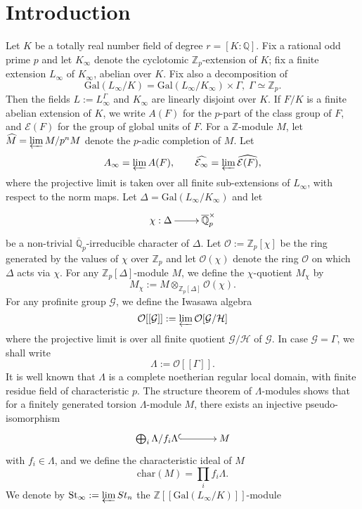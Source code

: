 \documentclass[reqno]{amsart}
\begin{document}
\section{Introduction}
 Let $K$ be a totally real number field of degree $r=[K:\mathbb{Q}]$. Fix a rational odd
prime $p$ and let $K_{\infty}$ denote the cyclotomic
$\mathbb{Z}_{p}$-extension of $K$; fix  a finite extension
$L_{\infty}$ of $K_{\infty}$, abelian over $K$. Fix also a
decomposition of
$$
\mathrm{Gal}(L_{\infty}/K)=\mathrm{Gal}(L_{\infty}/K_{\infty})\times
\Gamma,\; \Gamma\simeq \mathbb{Z}_{p}.
$$
Then the fields $L:=L_{\infty}^{\Gamma}$ and $K_{\infty}$ are
linearly disjoint over $K$. \vskip 7pt If $F/K$ is a finite abelian
extension of $K$, we write $A(F)$ for the $p$-part of the class
group of $F$, and $\mathcal{E}(F)$ for the group of global units of
$F$. For a $\mathbb{Z}$-module $M$, let $\widehat{M}=\varprojlim
M/p^{n}M$ denote the $p$-adic completion of $M$. Let
$$
A_{\infty}=\varprojlim A(F),\quad\quad
\widehat{\mathcal{E}_{\infty}}=\varprojlim \widehat{\mathcal{E}(F)},
$$
where the projective limit is taken over all finite sub-extensions
of $L_{\infty}$, with respect to  the norm maps. Let
$\Delta=\mathrm{Gal}(L_{\infty}/K_{\infty})$ and let
$$
\xymatrix@=2pc{ \chi : \Delta\ar[r]&
\overline{\mathbb{Q}}_{p}^{\times}}
$$
be a non-trivial $\overline{\mathbb{Q}}_{p}$-irreducible character
of $\Delta$. Let $\mathcal{O}:=\mathbb{Z}_{p}[\chi]$ be the ring
generated by the values of $\chi$ over $\mathbb{Z}_{p}$ and let
$\mathcal{O}(\chi)$ denote the ring $\mathcal{O}$ on which $\Delta$
acts via $\chi$. For any $\mathbb{Z}_{p}[\Delta]$-module $M$, we
define the $\chi$-quotient $M_{\chi}$ by
$$
M_{\chi}:=M\otimes_{\mathbb{Z}_{p}[\Delta]}\mathcal{O}(\chi).
$$
For any profinite group $\mathcal{G}$, we define the Iwasawa algebra
$$
\mathcal{O}[[\mathcal{G}]]:=\varprojlim
\mathcal{O}[\mathcal{G}/\mathcal{H}]
$$
where the projective limit is over all finite quotient
$\mathcal{G}/\mathcal{H}$ of $\mathcal{G}$. In case
$\mathcal{G}=\Gamma$, we shall write
$$
\Lambda:=\mathcal{O}[[\Gamma]].
$$
It is well known that $\Lambda$ is a complete noetherian regular
local domain, with finite residue field of characteristic $p$. The
structure theorem of $\Lambda$-modules shows that for a finitely
generated torsion $\Lambda$-module $M$, there exists an injective
pseudo-isomorphism
$$
\xymatrix@=3pc{ \bigoplus_{i}\Lambda/f_{i}\Lambda\ar@{^{(}->}[r]& M}
$$
with $f_{i}\in \Lambda$, and we define the characteristic ideal of
$M$
$$
\mathrm{char}(M)=\prod_{i}f_{i}\Lambda.
$$
 We denote by $\mathrm{St}_{\infty}:=\varprojlim St_{n}$ the $\mathbb{Z}[[\mathrm{Gal}(L_{\infty}/K)]]$-module
\end{document}
